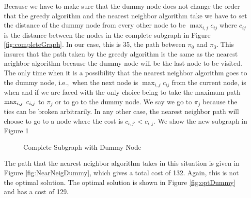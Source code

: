 Because we have to make sure that the dummy node does not change the order that the greedy algorithm and the nearest neighbor algorithm take we have to set the distance of the dummy node from every other node to be $\max_{i,j} c_{ij} $ where $c_{ij}$ is the distance between the nodes in the complete subgraph in Figure \ref{fig:completeGraph}. In our case, this is 35, the path between $\pi_0$ and $\pi_3$. This insures that the path taken by the greedy algorithm is the same as the nearest neighbor algorithm because the dummy node will be the last node to be visited. The only time when it is a possibility that the nearest neighbor algorithm goes to the dummy node, i.e.,\ when the next node is $\max_{i,j} c_{ij}$ from the current node, is when and if we are faced with the only choice being to take the maximum path $ \max_{i,j} \hspace{0.1cm} c_{i,j}$ to $\pi_j$ or to go to the dummy node. We say we go to $\pi_j$ because the ties can be broken arbitrarily. In any other case, the nearest neighbor path will choose to go to a node where the cost is $c_{i,j'} < c_{i,j}$. We show the new subgraph in Figure \ref{fig:completeDummy}

\begin{figure}
\centering
{}
\caption{Complete Subgraph with Dummy Node}
\label{fig:completeDummy}
\end{figure}

The path that the nearest neighbor algorithm takes in this situation is given in Figure \ref{fig:NearNeigDummy}, which gives a total cost of 132. Again, this is not the optimal solution. The optimal solution is shown in Figure \ref{fig:optDummy} and has a cost of 129.

